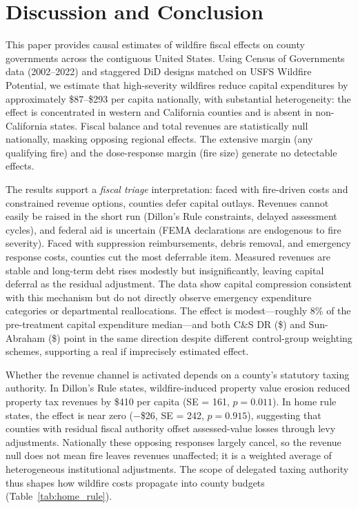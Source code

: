 \documentclass[12pt]{article}
\begin{document}
\section{Discussion and Conclusion}

This paper provides causal estimates of wildfire fiscal effects on county governments
across the contiguous United States. Using Census of Governments data (2002--2022)
and staggered DiD designs matched on USFS Wildfire Potential, we estimate that
high-severity wildfires reduce capital expenditures by approximately \$87--\$293 per
capita nationally, with substantial heterogeneity: the effect is concentrated in
western and California counties and is absent in non-California states. Fiscal balance
and total revenues are statistically null nationally, masking opposing regional
effects. The extensive margin (any qualifying fire) and the dose-response margin
(fire size) generate no detectable effects.

The results support a \emph{fiscal triage} interpretation: faced with fire-driven
costs and constrained revenue options, counties defer capital outlays. Revenues
cannot easily be raised in the short run (Dillon's Rule constraints, delayed
assessment cycles), and federal aid is uncertain (FEMA declarations are endogenous
to fire severity). Faced with suppression reimbursements, debris removal, and
emergency response costs, counties cut the most deferrable item. Measured revenues
are stable and long-term debt rises modestly but insignificantly, leaving capital
deferral as the residual adjustment. The data show capital compression consistent
with this mechanism but do not directly observe emergency expenditure categories or
departmental reallocations. The effect is modest---roughly 8\% of the pre-treatment
capital expenditure median---and both C\&S DR (\$) and Sun-Abraham (\$)
point in the same direction despite different control-group weighting schemes,
supporting a real if imprecisely estimated effect.

Whether the revenue channel is activated depends on a county's statutory taxing
authority. In Dillon's Rule states, wildfire-induced property value erosion reduced
property tax revenues by \$410 per capita (SE = 161, $p = 0.011$). In home rule
states, the effect is near zero ($-$\$26, SE = 242, $p = 0.915$), suggesting that
counties with residual fiscal authority offset assessed-value losses through levy
adjustments. Nationally these opposing responses largely cancel, so the revenue null
does not mean fire leaves revenues unaffected; it is a weighted average of
heterogeneous institutional adjustments. The scope of delegated taxing authority
thus shapes how wildfire costs propagate into county budgets
(Table~\ref{tab:home_rule}).
\end{document}

